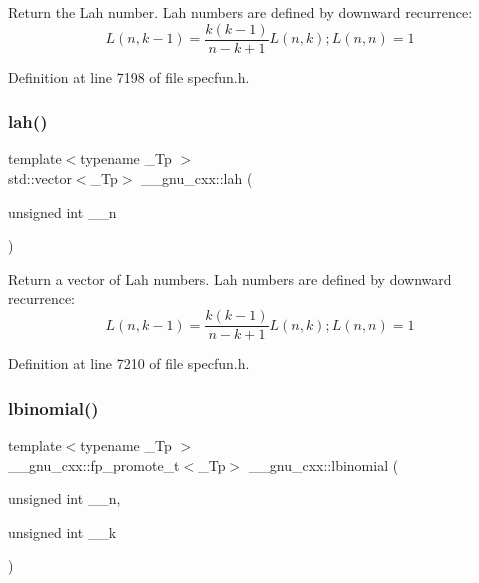 Return the Lah number. Lah numbers are defined by downward recurrence\+: \[ L(n,k-1) = \frac{k(k-1)}{n-k+1}L(n,k); L(n,n) = 1 \] 

Definition at line 7198 of file specfun.\+h.

\mbox{\label{group__gnu__math__spec__func_ga161fe80a0d88f67a5a16ef2dcc3d4645}} 
\subsubsection{\texorpdfstring{lah()}{lah()}\hspace{0.1cm}{\footnotesize\ttfamily [2/2]}}
{\footnotesize\ttfamily template$<$typename \+\_\+\+Tp $>$ \\
std\+::vector$<$\+\_\+\+Tp$>$ \+\_\+\+\_\+gnu\+\_\+cxx\+::lah (\begin{DoxyParamCaption}\item[{unsigned int}]{\+\_\+\+\_\+n }\end{DoxyParamCaption})\hspace{0.3cm}{\ttfamily [inline]}}

Return a vector of Lah numbers. Lah numbers are defined by downward recurrence\+: \[ L(n,k-1) = \frac{k(k-1)}{n-k+1}L(n,k); L(n,n) = 1 \] 

Definition at line 7210 of file specfun.\+h.

\mbox{\label{group__gnu__math__spec__func_gabfa5aeba56edfa110846fc8e76963bc2}} 
\subsubsection{\texorpdfstring{lbinomial()}{lbinomial()}}
{\footnotesize\ttfamily template$<$typename \+\_\+\+Tp $>$ \\
\+\_\+\+\_\+gnu\+\_\+cxx\+::fp\+\_\+promote\+\_\+t$<$\+\_\+\+Tp$>$ \+\_\+\+\_\+gnu\+\_\+cxx\+::lbinomial (\begin{DoxyParamCaption}\item[{unsigned int}]{\+\_\+\+\_\+n,  }\item[{unsigned int}]{\+\_\+\+\_\+k }\end{DoxyParamCaption})\hspace{0.3cm}{\ttfamily [inline]}}



